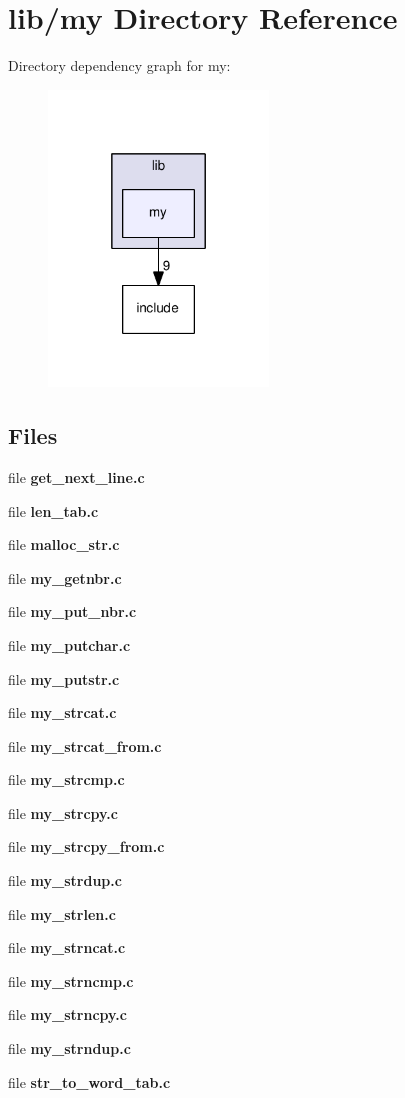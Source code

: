 \section{lib/my Directory Reference}
\label{dir_9d44753e04ffb2096b193bfbdacbac92}
Directory dependency graph for my\-:\nopagebreak
\begin{figure}[H]
\begin{center}
\leavevmode
\includegraphics[width=166pt]{dir_9d44753e04ffb2096b193bfbdacbac92_dep}
\end{center}
\end{figure}
\subsection*{Files}
\begin{DoxyCompactItemize}
\item 
file {\bf get\-\_\-next\-\_\-line.\-c}
\item 
file {\bf len\-\_\-tab.\-c}
\item 
file {\bf malloc\-\_\-str.\-c}
\item 
file {\bf my\-\_\-getnbr.\-c}
\item 
file {\bf my\-\_\-put\-\_\-nbr.\-c}
\item 
file {\bf my\-\_\-putchar.\-c}
\item 
file {\bf my\-\_\-putstr.\-c}
\item 
file {\bf my\-\_\-strcat.\-c}
\item 
file {\bf my\-\_\-strcat\-\_\-from.\-c}
\item 
file {\bf my\-\_\-strcmp.\-c}
\item 
file {\bf my\-\_\-strcpy.\-c}
\item 
file {\bf my\-\_\-strcpy\-\_\-from.\-c}
\item 
file {\bf my\-\_\-strdup.\-c}
\item 
file {\bf my\-\_\-strlen.\-c}
\item 
file {\bf my\-\_\-strncat.\-c}
\item 
file {\bf my\-\_\-strncmp.\-c}
\item 
file {\bf my\-\_\-strncpy.\-c}
\item 
file {\bf my\-\_\-strndup.\-c}
\item 
file {\bf str\-\_\-to\-\_\-word\-\_\-tab.\-c}
\end{DoxyCompactItemize}
